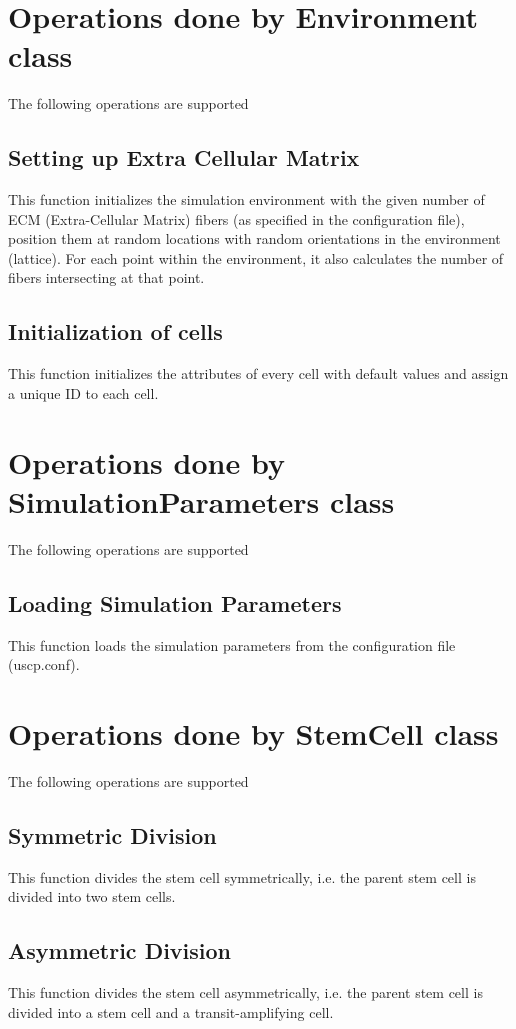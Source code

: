 \documentclass[11pt]{report}
\begin{document}
  \section{\color{red} Operations done by Environment class}
  The following operations are supported
  \subsection{\color{blue}Setting up Extra Cellular Matrix}
  This function initializes the simulation environment with the given number of ECM (Extra-Cellular Matrix) fibers (as specified in the configuration file), position them at random locations with random orientations in the environment (lattice).
  For each point within the environment, it also calculates the number of fibers intersecting at that point.
  \subsection{\color{blue}Initialization of cells}
  This function initializes the attributes of every cell with default values and assign a unique ID to each cell.
  
  \section{\color{red} Operations done by SimulationParameters class}
  The following operations are supported
  \subsection{\color{blue}Loading Simulation Parameters}
  This function loads the simulation parameters from the configuration file (uscp.conf).
  
  \section{\color{red} Operations done by StemCell class}
  The following operations are supported
  \subsection{\color{blue}Symmetric Division}
  This function divides the stem cell symmetrically, i.e. the parent stem cell is divided into two stem cells.
  \subsection{\color{blue}Asymmetric Division}
  This function divides the stem cell asymmetrically, i.e. the parent stem cell is divided into a stem cell and a transit-amplifying cell.
  
\end{document}
